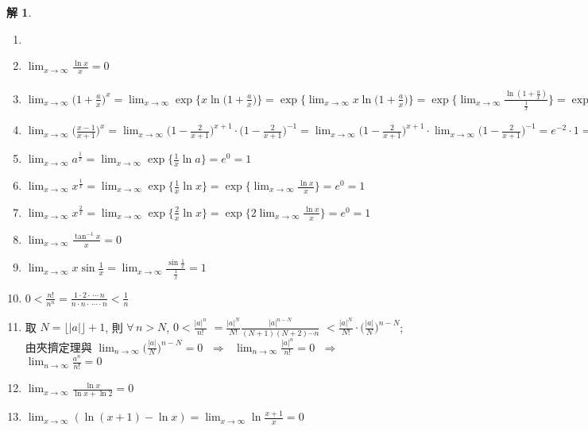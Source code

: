 \documentclass[12pt]{extarticle}
\newcommand{\ds}{\displaystyle}
\newcommand{\ie}{\;\Longrightarrow\;}
\newcommand{\floor}[1]{\lfloor #1 \rfloor}
\theoremstyle{definition}
\newtheorem*{sol}{解}
\begin{document}
\begin{sol}
  \begin{enumerate}\setlength\itemsep{0em}
    \item[]
    \item $\ds \lim_{x\to\infty}\frac{\ln x}{x} = 0$
    \item $\ds \lim_{x\to\infty}\Big(1 + \frac{a}{x}\Big)^x = \lim_{x\to\infty}\exp\Big\{x\ln\Big(1 + \frac{a}{x}\Big)\Big\} = \exp\Big\{\lim_{x\to\infty}x\ln\Big(1 + \frac{a}{x}\Big)\Big\} = \exp\bigg\{\lim_{x\to\infty}\frac{\ln(1 + \frac{a}{x})}{\frac{1}{x}}\bigg\} = \exp\Bigg\{\lim_{x\to\infty}\frac{\frac{-\frac{a}{x^2}}{1 + \frac{a}{x}}}{-\frac{1}{x^2}}\Bigg\} = e^a$
    \item $\ds \lim_{x\to\infty}\Big(\frac{x - 1}{x + 1}\Big)^x = \lim_{x\to\infty}\Big(1 - \frac{2}{x + 1}\Big)^{x + 1}\cdot\Big(1 - \frac{2}{x + 1}\Big)^{-1} = \lim_{x\to\infty}\Big(1 - \frac{2}{x + 1}\Big)^{x + 1}\cdot\lim_{x\to\infty}\Big(1 - \frac{2}{x + 1}\Big)^{-1} = e^{-2}\cdot 1 = e^{-2}$
    \item $\ds\lim_{x\to\infty} a^{\frac{1}{x}} = \lim_{x\to\infty}\exp\Big\{\frac{1}{x}\ln a\Big\} = e^0 = 1$
    \item $\ds \lim_{x\to\infty} x^{\frac{1}{x}} = \lim_{x\to\infty}\exp\Big\{\frac{1}{x}\ln x\Big\} = \exp\Big\{\lim_{x\to\infty}\frac{\ln x}{x}\Big\} = e^0 = 1$
    \item $\ds \lim_{x\to\infty} x^{\frac{2}{x}} = \lim_{x\to\infty}\exp\Big\{\frac{2}{x}\ln x\Big\} = \exp\Big\{2\lim_{x\to\infty}\frac{\ln x}{x}\Big\} = e^0 = 1$
    \item $\ds \lim_{x\to\infty}\frac{\tan^{-1} x}{x} = 0$
    \item $\ds \lim_{x\to\infty}x\sin\frac{1}{x} = \lim_{x\to\infty}\frac{\sin\frac{1}{x}}{\frac{1}{x}} = 1$
    \item $\ds 0 < \frac{n!}{n^n} = \frac{1\cdot 2\cdot\,\cdots\,n}{n\cdot n\cdot\,\cdots\cdot n} < \frac{1}{n}$
    \item 取 $N = \floor{|a|} + 1$, 則 $\forall\,n > N$, $\ds 0 < \frac{|a|^n}{n!}$ $\ds= \frac{|a|^N}{N!}\frac{|a|^{n - N}}{(N + 1)(N + 2)\cdots n}$ $\ds< \frac{|a|^N}{N!}\cdot\bigg(\frac{|a|}{N}\bigg)^{n - N}$; 由夾擠定理與 $\ds\lim_{n\to\infty}\bigg(\frac{|a|}{N}\bigg)^{n - N} = 0$ $\ie$ $\ds\lim_{n\to\infty}\frac{|a|^n}{n!} = 0$ $\ie$ $\ds\lim_{n\to\infty}\frac{a^n}{n!} = 0$ 
    \item $\ds \lim_{x\to\infty}\frac{\ln x}{\ln x + \ln 2} = 0$
    \item $\ds \lim_{x\to\infty}(\ln(x + 1) - \ln x) = \lim_{x\to\infty}\ln\frac{x + 1}{x} = 0$
  \end{enumerate}
\end{sol}
\end{document}
